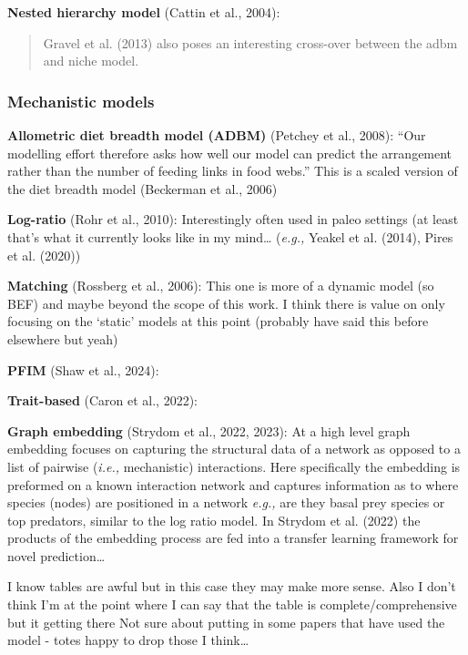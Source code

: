 \documentclass[
]{agujournal2019}
\begin{document}
\textbf{Nested hierarchy model} (Cattin et al., 2004):

\begin{quote}
Gravel et al. (2013) also poses an interesting cross-over between the
adbm and niche model.
\end{quote}

\subsubsection{Mechanistic models}\label{mechanistic-models}

\textbf{Allometric diet breadth model (ADBM)} (Petchey et al., 2008):
``Our modelling effort therefore asks how well our model can predict the
arrangement rather than the number of feeding links in food webs.'' This
is a scaled version of the diet breadth model (Beckerman et al., 2006)

\textbf{Log-ratio} (Rohr et al., 2010): Interestingly often used in
paleo settings (at least that's what it currently looks like in my
mind\ldots{} (\emph{e.g.,} Yeakel et al. (2014), Pires et al. (2020))

\textbf{Matching} (Rossberg et al., 2006): This one is more of a dynamic
model (so BEF) and maybe beyond the scope of this work. I think there is
value on only focusing on the `static' models at this point (probably
have said this before elsewhere but yeah)

\textbf{PFIM} (Shaw et al., 2024):

\textbf{Trait-based} (Caron et al., 2022):

\textbf{Graph embedding} (Strydom et al., 2022, 2023): At a high level
graph embedding focuses on capturing the structural data of a network as
opposed to a list of pairwise (\emph{i.e.,} mechanistic) interactions.
Here specifically the embedding is preformed on a known interaction
network and captures information as to where species (nodes) are
positioned in a network \emph{e.g.,} are they basal prey species or top
predators, similar to the log ratio model. In Strydom et al. (2022) the
products of the embedding process are fed into a transfer learning
framework for novel prediction\ldots{}

I know tables are awful but in this case they may make more sense. Also
I don't think I'm at the point where I can say that the table is
complete/comprehensive but it getting there Not sure about putting in
some papers that have used the model - totes happy to drop those I
think\ldots{}
\end{document}
